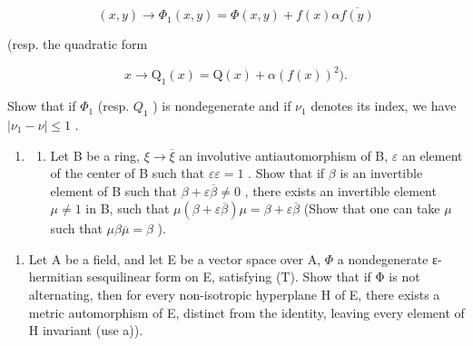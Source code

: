 \[
(x, y) \rightarrow \Phi_ {1} (x, y) = \Phi (x, y) + f (x) \alpha \overline {{f (y)}}
\]

(resp. the quadratic form

\[
x \rightarrow \mathrm{Q} _ {1} (x) = \mathrm{Q} (x) + \alpha (f (x)) ^ {2}).
\]

Show that if \(\Phi_{1}\) (resp. \(Q_{1}\) ) is nondegenerate and if \(\nu_{1}\) denotes its index, we have \(|\nu_{1} - \nu| \leqslant 1\) .

\begin{enumerate}
\def\labelenumi{\arabic{enumi})}
\setcounter{enumi}{4}
\tightlist
\item
  \begin{enumerate}
  \def\labelenumii{\alph{enumii})}
  \tightlist
  \item
    Let B be a ring, \(\xi \to \overline{\xi}\) an involutive antiautomorphism of B, \(\varepsilon\) an element of the center of B such that \(\varepsilon \varepsilon = 1\) . Show that if \(\beta\) is an invertible element of B such that \(\beta + \varepsilon \overline{\beta} \neq 0\) , there exists an invertible element \(\mu \neq 1\) in B, such that \(\mu (\beta + \varepsilon \overline{\beta}) \mu = \beta + \varepsilon \overline{\beta}\) (Show that one can take \(\mu\) such that \(\mu \beta \overline{\mu} = \beta\) ).
  \end{enumerate}
\end{enumerate}

\begin{enumerate}
\def\labelenumi{\alph{enumi})}
\setcounter{enumi}{1}
\tightlist
\item
  Let A be a field, and let E be a vector space over A, \(\Phi\) a nondegenerate ε-hermitian sesquilinear form on E, satisfying (T). Show that if Φ is not alternating, then for every non-isotropic hyperplane H of E, there exists a metric automorphism of E, distinct from the identity, leaving every element of H invariant (use a)).
\end{enumerate}


